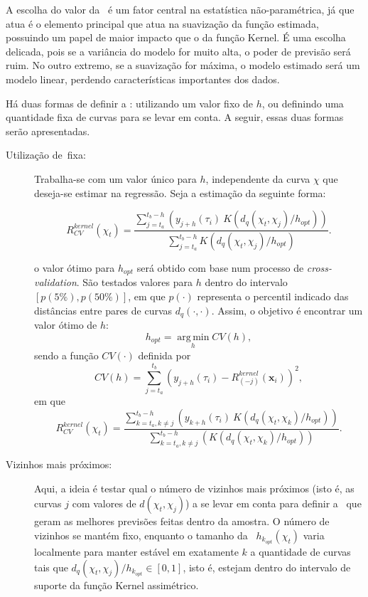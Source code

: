 \documentclass[
	12pt,				%
	openright,			%
	oneside,			%
	a4paper,			%
	english,			%
	brazil				%
	]{dissertacao-ufrgs-abntex2}
\begin{document}
A escolha do valor da \bw~é um fator central na estatística não-paramétrica, já que atua é o elemento principal que atua na suavização da função estimada, possuindo um papel de maior impacto que o da função Kernel. É uma escolha delicada, pois se a variância do modelo for muito alta, o poder de previsão será ruim. No outro extremo, se a suavização for máxima, o modelo estimado será um modelo linear, perdendo características importantes dos dados.

Há duas formas de definir a \bw: utilizando um valor fixo de $h$, ou definindo uma quantidade fixa de curvas para se levar em conta. A seguir, essas duas formas serão apresentadas.

\begin{description}

\item[Utilização de \bw \,fixa:]

Trabalha-se com um valor único para $h$, independente da curva $\chi$ que deseja-se estimar na regressão. Seja a estimação da seguinte forma:

\begin{equation}
R_{CV}^{kernel}(\chi_t) = 
\frac
	{\sum \limits_{j=t_a}^{t_b-h} \left( y_{j+h}(\tau_i)~ K(d_{q}(\chi_t,\chi_j)/h_{opt}) \right) }
	{\sum \limits_{j=t_a}^{t_b-h} K(d_{q}(\chi_t,\chi_j)/h_{opt}) }.
\end{equation}


o valor ótimo para $h_{opt}$ será obtido com base num processo de \emph{cross-validation}. São testados valores para $h$ dentro do intervalo $[p(5\%),p(50\%)]$, em que $p(\cdot)$ representa o percentil indicado das distâncias entre pares de curvas $d_q(\cdot,\cdot)$. Assim, o objetivo é encontrar um valor ótimo de $h$:
\[h_{opt} = \operatorname*{arg\,min}_h CV(h),\]
sendo a função $CV(\cdot)$ definida por
\[
CV(h) = \sum \limits_{j=t_a}^{t_b} \left(  y_{j+h}(\tau_i) - R_{(-j)}^{kernel}(\boldsymbol{x}_i)  \right)^2, 
\]
em que
\[
R_{CV}^{kernel}(\chi_t) = 
\frac
	{\sum \limits_{k=t_a, k \neq j}^{t_b-h} \left( y_{k+h}(\tau_i)~ K(d_{q}(\chi_t,\chi_k)/h_{opt}) \right) }
	{\sum \limits_{k=t_a, k \neq j}^{t_b-h} \left( K(d_{q}(\chi_t,\chi_k)/h_{opt}) \right)  }.
\]



\item[Vizinhos mais próximos:]

Aqui, a ideia é testar qual o número de vizinhos mais próximos (isto é, as curvas $j$ com valores de $d(\chi_t,\chi_j)$) a se levar em conta para definir a \bw~que geram as melhores previsões feitas dentro da amostra.
O número de vizinhos se mantém fixo, enquanto o tamanho da \bw~$h_{k_{opt}}(\chi_t)$ varia localmente para manter estável em exatamente $k$ a quantidade de curvas tais que $d_{q}(\chi_t,\chi_{j})/h_{k_{opt}} \in [0,1]$, isto é, estejam dentro do intervalo de suporte da função Kernel assimétrico.


\end{description}
\end{document}

